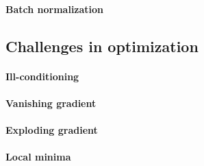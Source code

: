         \paragraph{Batch normalization}


    \subsection{Challenges in optimization}

        \paragraph{Ill-conditioning}

        \paragraph{Vanishing gradient}

        \paragraph{Exploding gradient}

        \paragraph{Local minima}

    


